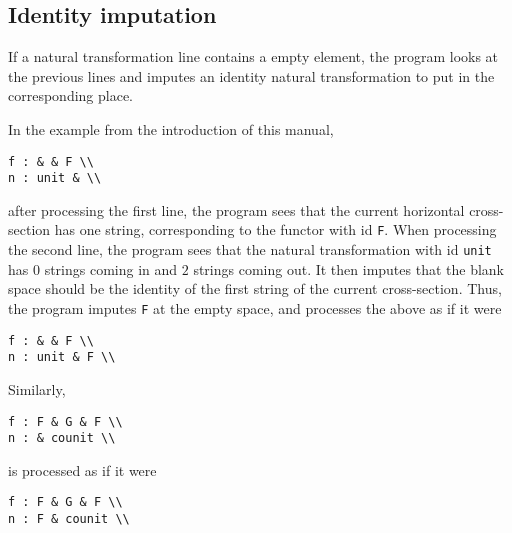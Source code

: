 \documentclass{amsart}
\newcommand{\vlength}{0.2cm}
\begin{document}
\subsection{Identity imputation}
If a natural transformation line contains a empty element,
    the program looks at the previous lines and imputes an identity natural transformation to put
    in the corresponding place.
\begin{example}
In the example from the introduction of this manual,
\vspace\vlength
\begin{verbatim}
f : & & F \\
n : unit & \\
\end{verbatim}
\vspace\vlength
    after processing the first line, the program sees that the current horizontal cross-section has one string,
    corresponding to the functor with id \texttt{F}.
When processing the second line, the program sees that the natural transformation with
    id \texttt{unit} has $0$ strings coming in and $2$ strings coming out.
It then imputes that the blank space should be the identity of the first string of the current
cross-section.
Thus, the program imputes \texttt{F} at the empty space, and processes the above as if it were
\vspace\vlength
\begin{verbatim}
f : & & F \\
n : unit & F \\
\end{verbatim}
\vspace\vlength
Similarly,
\vspace\vlength
\begin{verbatim}
f : F & G & F \\
n : & counit \\
\end{verbatim}
\vspace\vlength
is processed as if it were
\vspace\vlength
\begin{verbatim}
f : F & G & F \\
n : F & counit \\
\end{verbatim}
\vspace\vlength
\end{example}
\end{document}
